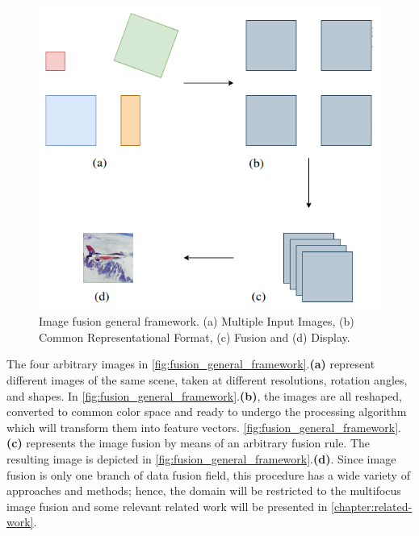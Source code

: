 \begin{figure}[H]
	\centering
	\caption{\label{fig:fusion_general_framework}Image fusion general framework. (a) Multiple Input Images, (b) Common Representational Format, (c) Fusion and (d) Display.}
	\begin{center}
    \includegraphics[scale=0.4]{images/image_fusion_scheme.png}
	\end{center}
	\centering
    \fautor
\end{figure}

The four arbitrary images in \autoref{fig:fusion_general_framework}.\textbf{(a)} represent different images of the same scene, taken at different resolutions, rotation angles, and shapes. In \autoref{fig:fusion_general_framework}.\textbf{(b)}, the images are all reshaped, converted to common color space and ready to undergo the processing algorithm which will transform them into feature vectors. \autoref{fig:fusion_general_framework}.\textbf{(c)} represents the image fusion by means of an arbitrary fusion rule. The resulting image is depicted in \autoref{fig:fusion_general_framework}.\textbf{(d)}. Since image fusion is only one branch of data fusion field, this procedure has a wide variety of approaches and methods; hence, the domain will be restricted to the multifocus image fusion and some relevant related work will be presented in \autoref{chapter:related-work}.